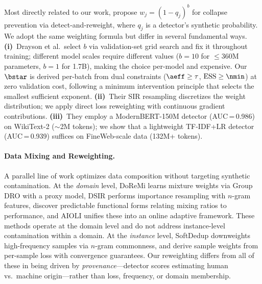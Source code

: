Most directly related to our work, \cite{drayson2025detection} propose $w_j = (1{-}q_j)^b$ for collapse prevention via detect-and-reweight, where $q_j$ is a detector's synthetic probability.
We adopt the same weighting formula but differ in several fundamental ways.
\textbf{(i)}~Drayson et al.\ select $b$ via validation-set grid search and fix it throughout training; different model scales require different values ($b{=}10$ for ${\leq}360$M parameters, $b{=}1$ for 1.7B), making the choice per-model and expensive.
Our $\bstar$ is derived per-batch from dual constraints ($\aeff \geq \tau$, $\mathrm{ESS} \geq \nmin$) at zero validation cost, following a minimum intervention principle that selects the smallest sufficient exponent.
\textbf{(ii)}~Their SIR resampling discretizes the weight distribution; we apply direct loss reweighting with continuous gradient contributions.
\textbf{(iii)}~They employ a ModernBERT-150M detector (AUC\,=\,0.986) on WikiText-2 (${\sim}$2M tokens); we show that a lightweight TF-IDF+LR detector (AUC\,=\,0.939) suffices on FineWeb-scale data (132M+ tokens).

\paragraph{Data Mixing and Reweighting.}
A parallel line of work optimizes data composition without targeting synthetic contamination.
At the \emph{domain} level, DoReMi \citep{xie2023doremi} learns mixture weights via Group DRO with a proxy model, DSIR \citep{xie2023dsir} performs importance resampling with $n$-gram features, \cite{ye2025mixing} discover predictable functional forms relating mixing ratios to performance, and AIOLI \citep{chen2025aioli} unifies these into an online adaptive framework.
These methods operate at the domain level and do not address instance-level contamination within a domain.
At the \emph{instance} level, SoftDedup \citep{he2024softdedup} downweights high-frequency samples via $n$-gram commonness, and \cite{sow2025dynamic} derive sample weights from per-sample loss with convergence guarantees.
Our reweighting differs from all of these in being driven by \emph{provenance}---detector scores estimating human vs.\ machine origin---rather than loss, frequency, or domain membership.

